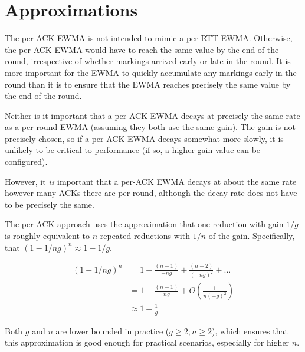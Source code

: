 \section{Approximations}\label{prresp_approx}

\balance
The per-ACK EWMA is not intended to mimic a per-RTT EWMA. Otherwise, the per-ACK
EWMA would have to reach the same value by the end of the round, irrespective of
whether markings arrived early or late in the round.
It is more important for the EWMA to quickly accumulate any markings early in
the round than it is to ensure that the EWMA reaches precisely the same value by
the end of the round. 

Neither is it important that a per-ACK EWMA decays at precisely the same rate as
a per-round EWMA (assuming they both use the same gain). The gain is not
precisely chosen, so if a per-ACK EWMA decays somewhat more slowly, it is
unlikely to be critical to performance (if so, a higher gain value can be
configured).

However, it \emph{is} important that a per-ACK EWMA decays at about the same
rate however many ACKs there are per round, although the decay rate does not
have to be precisely the same.

The per-ACK approach uses the approximation that one reduction with gain \(1/g\)
is roughly equivalent to \(n\) repeated reductions with \(1/n\) of the gain.
Specifically, that \((1 - 1/ng)^n \approx 1 - 1/g\).

\begin{align*}
(1 - 1/ng)^n &=       1 + \frac{(n-1)}{-ng} + \frac{(n-2)}{(-ng)^2} + \ldots \\
             &=       1 - \frac{(n-1)}{ng} + O\left(\frac{1}{n(-g)^2}\right)\\
             &\approx 1 - \frac{1}{g}
\end{align*}

Both \(g\) and \(n\) are lower bounded in practice (\(g\ge2; n\ge2\)), which
ensures that this approximation is good enough for practical scenarios,
especially for higher \(n\).

